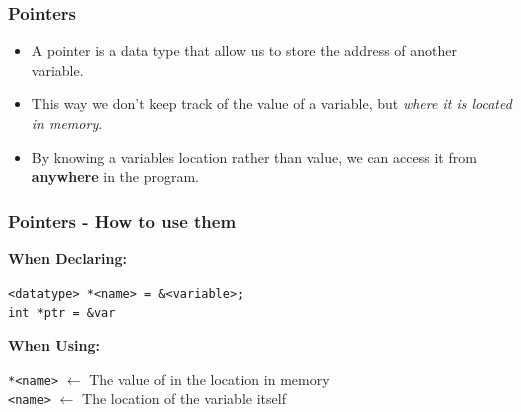 \documentclass{beamer}
\begin{document}
\begin{frame}
    \frametitle{Pointers}
    
    \begin{itemize}
        \item A pointer is a data type that allow us to store the address of another variable.
        \item This way we don't keep track of the value of a variable, but \textit{where it is located in memory}.
        \item By knowing a variables location rather than value, we can access it from \textbf{anywhere} in the program.
    \end{itemize}

\end{frame}

\begin{frame}
    \frametitle{Pointers - How to use them}

    \textbf{When Declaring:}

    \texttt{<datatype> *<name> = \&<variable>;} \\
    \texttt{int *ptr = \&var}

    \textbf{When Using:}

    \texttt{*<name>} $\leftarrow$ The value of in the location in memory\\
    \texttt{<name>} $\leftarrow$ The location of the variable itself\\
    
\end{frame}
\end{document}
